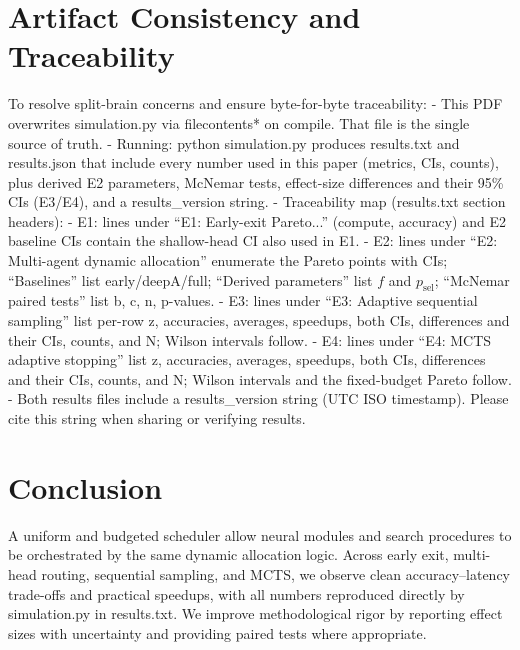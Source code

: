 \section{Artifact Consistency and Traceability}
To resolve split-brain concerns and ensure byte-for-byte traceability:
- This PDF overwrites simulation.py via filecontents* on compile. That file is the single source of truth.
- Running: python simulation.py produces results.txt and results.json that include every number used in this paper (metrics, CIs, counts), plus derived E2 parameters, McNemar tests, effect-size differences and their 95\% CIs (E3/E4), and a results\_version string.
- Traceability map (results.txt section headers):
  - E1: lines under ``E1: Early-exit Pareto...'' (compute, accuracy) and E2 baseline CIs contain the shallow-head CI also used in E1.
  - E2: lines under ``E2: Multi-agent dynamic allocation'' enumerate the Pareto points with CIs; ``Baselines'' list early/deepA/full; ``Derived parameters'' list $f$ and $p_{\mathrm{sel}}$; ``McNemar paired tests'' list b, c, n, p-values.
  - E3: lines under ``E3: Adaptive sequential sampling'' list per-row z, accuracies, averages, speedups, both CIs, differences and their CIs, counts, and N; Wilson intervals follow.
  - E4: lines under ``E4: MCTS adaptive stopping'' list z, accuracies, averages, speedups, both CIs, differences and their CIs, counts, and N; Wilson intervals and the fixed-budget Pareto follow.
- Both results files include a results\_version string (UTC ISO timestamp). Please cite this string when sharing or verifying results.

\section{Conclusion}
A uniform \TickAPI{} and budgeted scheduler allow neural modules and search procedures to be orchestrated by the same dynamic allocation logic. Across early exit, multi-head routing, sequential sampling, and MCTS, we observe clean accuracy--latency trade-offs and practical speedups, with all numbers reproduced directly by simulation.py in results.txt. We improve methodological rigor by reporting effect sizes with uncertainty and providing paired tests where appropriate.

